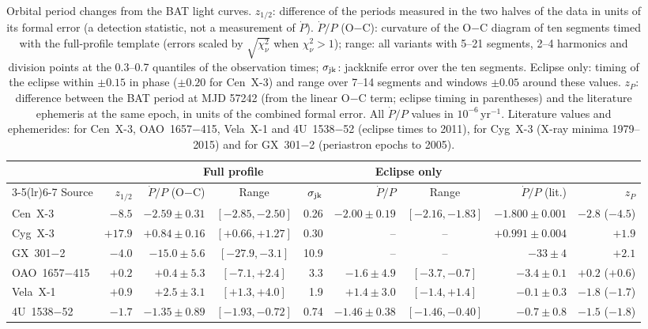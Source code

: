 \begin{table}[t]
\caption{Orbital period changes from the BAT light curves. $z_{1/2}$: difference of the periods measured in the two halves of the data in units of its formal error (a detection statistic, not a measurement of $\dot P$). $\dot P/P$ (O$-$C): curvature of the O$-$C diagram of ten segments timed with the full-profile template (errors scaled by $\sqrt{\chi^2_\nu}$ when $\chi^2_\nu>1$); range: all variants with 5--21 segments, 2--4 harmonics and division points at the 0.3--0.7 quantiles of the observation times; $\sigma_{\rm jk}$: jackknife error over the ten segments. Eclipse only: timing of the eclipse within $\pm0.15$ in phase ($\pm0.20$ for Cen~X-3) and range over 7--14 segments and windows $\pm0.05$ around these values. $z_P$: difference between the BAT period at MJD 57242 (from the linear O$-$C term; eclipse timing in parentheses) and the literature ephemeris at the same epoch, in units of the combined formal error. All $\dot P/P$ values in $10^{-6}$\,yr$^{-1}$. Literature values and ephemerides: \citet{falanga2015} for Cen~X-3, OAO~1657$-$415, Vela~X-1 and 4U~1538$-$52 (eclipse times to 2011), \citet{bhargava2017} for Cyg~X-3 (X-ray minima 1979--2015) and \citet{doroshenko2010} for GX~301$-$2 (periastron epochs to 2005).}\label{tab:pdot}
\centering\setlength{\tabcolsep}{3.8pt}
\begin{tabular}{@{}lrrcrrcrr@{}}
\toprule
 & & \multicolumn{3}{c}{Full profile} & \multicolumn{2}{c}{Eclipse only} & & \\
\cmidrule(lr){3-5}\cmidrule(lr){6-7}
Source & $z_{1/2}$ & $\dot P/P$ (O$-$C) & Range & $\sigma_{\rm jk}$ & $\dot P/P$ & Range & $\dot P/P$ (lit.) & $z_P$\\
\midrule
Cen~X-3 & $-8.5$ & $-2.59\pm0.31$ & $[-2.85,-2.50]$ & 0.26 & $-2.00\pm0.19$ & $[-2.16,-1.83]$ & $-1.800\pm0.001$ & $-2.8$ ($-4.5$) \\
Cyg~X-3 & $+17.9$ & $+0.84\pm0.16$ & $[+0.66,+1.27]$ & 0.30 & -- & -- & $+0.991\pm0.004$ & $+1.9$ \\
GX~301$-$2 & $-4.0$ & $-15.0\pm5.6$ & $[-27.9,-3.1]$ & 10.9 & -- & -- & $-33\pm4$ & $+2.1$ \\
OAO~1657$-$415 & $+0.2$ & $+0.4\pm5.3$ & $[-7.1,+2.4]$ & 3.3 & $-1.6\pm4.9$ & $[-3.7,-0.7]$ & $-3.4\pm0.1$ & $+0.2$ ($+0.6$) \\
Vela~X-1 & $+0.9$ & $+2.5\pm3.1$ & $[+1.3,+4.0]$ & 1.9 & $+1.4\pm3.0$ & $[-1.4,+1.4]$ & $-0.1\pm0.3$ & $-1.8$ ($-1.7$) \\
4U~1538$-$52 & $-1.7$ & $-1.35\pm0.89$ & $[-1.93,-0.72]$ & 0.74 & $-1.46\pm0.38$ & $[-1.46,-0.40]$ & $-0.7\pm0.8$ & $-1.5$ ($-1.8$) \\
\bottomrule
\end{tabular}
\end{table}
